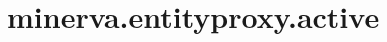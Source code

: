 \section{minerva.entityproxy.active}
\label{configuration:MinervaEntityproxyActive}
\AvailableInCsharpOnly{\TODO}